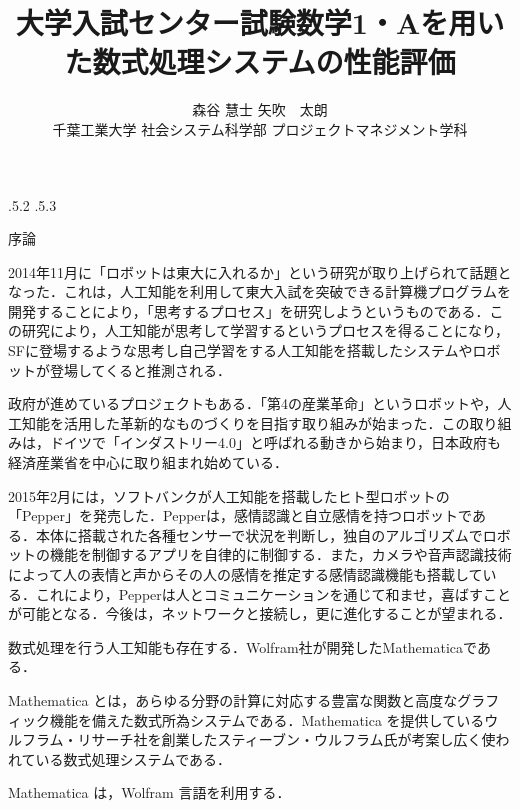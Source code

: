 \documentclass[uplatex,twocolumn]{jsarticle}
\title{\vspace{-14mm}大学入試センター試験数学1・Aを用いた数式処理システムの性能評価 \footnotemark[0]}
\author{森谷 慧士 \footnotemark[2] 矢吹　太朗  \\ 千葉工業大学 社会システム科学部 プロジェクトマネジメント学科\footnotemark[2]}
\date{}%
\makeatletter
\renewcommand{\section}{%
    \if@slide\clearpage\fi
    \@startsection{section}{1}{\z@}%
    {\Cvs \@plus.5\Cdp \@minus.2\Cdp}%
    {.5\Cvs \@plus.3\Cdp}%
    {\normalfont\raggedright}}
\makeatother
\begin{document}
\twocolumn[
	\maketitle
]

\begingroup
\def\thefootnote{\fnsymbol{footnote}}
\endgroup




\section{序論}


 
2014年11月に「ロボットは東大に入れるか」という研究が取り上げられて話題となった\cite{tourobo2014}．これは，人工知能を利用して東大入試を突破できる計算機プログラムを開発することにより，「思考するプロセス」を研究しようというものである．この研究により，人工知能が思考して学習するというプロセスを得ることになり，SFに登場するような思考し自己学習をする人工知能を搭載したシステムやロボットが登場してくると推測される．

政府が進めているプロジェクトもある．「第4の産業革命」というロボットや，人工知能を活用した革新的なものづくりを目指す取り組みが始まった．この取り組みは，ドイツで「インダストリー4.0」と呼ばれる動きから始まり，日本政府も経済産業省を中心に取り組まれ始めている\cite{sangyou2014}．

2015年2月には，ソフトバンクが人工知能を搭載したヒト型ロボットの「Pepper」を発売した．Pepperは，感情認識と自立感情を持つロボットである．本体に搭載された各種センサーで状況を判断し，独自のアルゴリズムでロボットの機能を制御するアプリを自律的に制御する．また，カメラや音声認識技術によって人の表情と声からその人の感情を推定する感情認識機能も搭載している．これにより，Pepperは人とコミュニケーションを通じて和ませ，喜ばすことが可能となる．今後は，ネットワークと接続し，更に進化することが望まれる\cite{softbank}．

数式処理を行う人工知能も存在する．Wolfram社が開発したMathematicaである．

Mathematica とは，あらゆる分野の計算に対応する豊富な関数と高度なグラフィック機能を備えた数式所為システムである．Mathematica を提供しているウルフラム・リサーチ社を創業したスティーブン・ウルフラム氏が考案し広く使われている数式処理システムである\cite{wolfram2014}．

Mathematica は，Wolfram 言語を利用する．
\end{document}
